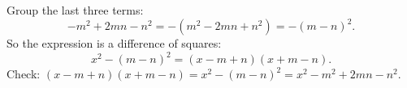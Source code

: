 Group the last three terms:
\[-m^2+2mn-n^2=-\left(m^2-2mn+n^2\right)=-(m-n)^2.\]
So the expression is a difference of squares:
\[x^2-(m-n)^2=\boxed{(x-m+n)(x+m-n)}.\]
Check: $(x-m+n)(x+m-n)=x^2-(m-n)^2=x^2-m^2+2mn-n^2$.
